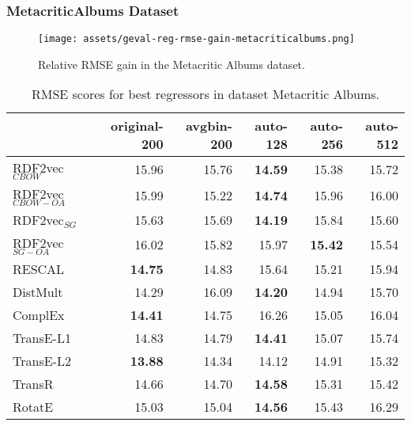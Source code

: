 \documentclass[11pt,titlepage,oneside,openany]{book}
\begin{document}
\newpage

\subsubsection{MetacriticAlbums Dataset}
\label{subsubsec:geval-results-reg-metacriticalbums}

\begin{figure}[H]
    \centering
    \texttt{[image: assets/geval-reg-rmse-gain-metacriticalbums.png]}
    \vspace*{-3mm}
    \caption{Relative RMSE gain in the Metacritic Albums dataset.}
    \label{fig:geval-reg-rmse-gain-metacriticalbums}
\end{figure}


\begin{table}[H]
\centering
\begin{tabular}{lrrrrr}
\toprule
{} &  original-200 &  avgbin-200 &  auto-128 &  auto-256 &  auto-512 \\
\midrule
RDF2vec$_{CBOW}$     &         15.96  &       15.76  &	\textbf{14.59} &     15.38  &     15.72  \\
RDF2vec$_{CBOW-OA}$  &         15.99  &       15.22  &	\textbf{14.74} &     15.96  &     16.00  \\
RDF2vec$_{SG}$       &         15.63  &       15.69  &	\textbf{14.19} &     15.84  &     15.60  \\
RDF2vec$_{SG-OA}$    &         16.02  &       15.82  &     15.97  &	\textbf{15.42} &     15.54  \\
RESCAL               &	\textbf{14.75} &       14.83  &     15.64  &     15.21  &     15.94  \\
DistMult             &         14.29  &       16.09  &	\textbf{14.20} &     14.94  &     15.70  \\
ComplEx              &	\textbf{14.41} &       14.75  &     16.26  &     15.05  &     16.04  \\
TransE-L1            &         14.83  &       14.79  &	\textbf{14.41} &     15.07  &     15.74  \\
TransE-L2            &	\textbf{13.88} &       14.34  &     14.12  &     14.91  &     15.32  \\
TransR               &         14.66  &       14.70  &	\textbf{14.58} &     15.31  &     15.42  \\
RotatE               &         15.03  &       15.04  &	\textbf{14.56} &     15.43  &     16.29  \\
\bottomrule
\end{tabular}
\caption{RMSE scores for best regressors in dataset Metacritic Albums.}
\label{tab:geval-reg-rmse-metacriticalbums}
\end{table}
\end{document}
